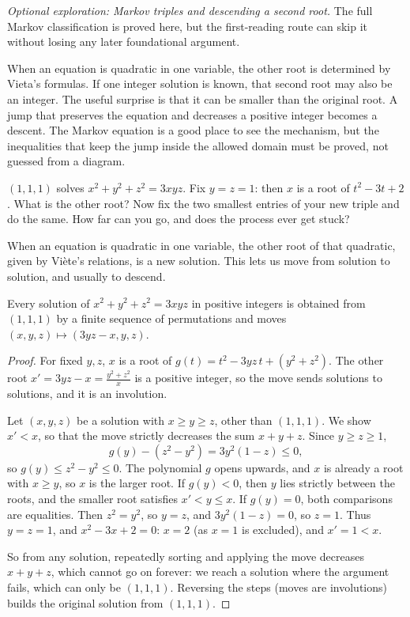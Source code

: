 \emph{Optional exploration: Markov triples and descending a second root.}
The full Markov classification is proved here, but the first-reading route
can skip it without losing any later foundational argument.

When an equation is quadratic in one variable, the other root is determined by Vieta's formulas. If one integer solution is known, that second root may also be an integer. The useful surprise is that it can be smaller than the original root. A jump that preserves the equation and decreases a positive integer becomes a descent. The Markov equation is a good place to see the mechanism, but the inequalities that keep the jump inside the allowed domain must be proved, not guessed from a diagram.

\begin{think}
$(1,1,1)$ solves $x^2+y^2+z^2=3xyz$. Fix $y=z=1$: then $x$ is a root of $t^2-3t+2$. What is the other root? Now fix the two smallest entries of your new triple and do the same. How far can you go, and does the process ever get stuck?
\end{think}

When an equation is quadratic in one variable, the other root of that quadratic, given by Vi\`ete's relations, is a new solution. This lets us move from solution to solution, and usually to descend.

\begin{theorem}[Markov, 1879]\label{thm:markov}
Every solution of $x^2+y^2+z^2=3xyz$ in positive integers is obtained from $(1,1,1)$ by a finite sequence of permutations and moves $(x,y,z)\mapsto(3yz-x,y,z)$.
\end{theorem}
\begin{proof}
For fixed $y,z$, $x$ is a root of $g(t)=t^2-3yz\,t+(y^2+z^2)$. The other root $x'=3yz-x=\frac{y^2+z^2}x$ is a positive integer, so the move sends solutions to solutions, and it is an involution.

Let $(x,y,z)$ be a solution with $x\ge y\ge z$, other than $(1,1,1)$. We show $x'<x$, so that the move strictly decreases the sum $x+y+z$. Since $y\ge z\ge1$,
\[
g(y)-(z^2-y^2)=3y^2(1-z)\le0,
\]
so $g(y)\le z^2-y^2\le0$. The polynomial $g$ opens upwards, and $x$ is already a root with $x\ge y$, so $x$ is the larger root. If $g(y)<0$, then $y$ lies strictly between the roots, and the smaller root satisfies $x'<y\le x$. If $g(y)=0$, both comparisons are equalities. Then $z^2=y^2$, so $y=z$, and $3y^2(1-z)=0$, so $z=1$. Thus $y=z=1$, and $x^2-3x+2=0$: $x=2$ (as $x=1$ is excluded), and $x'=1<x$.

So from any solution, repeatedly sorting and applying the move decreases $x+y+z$, which cannot go on forever: we reach a solution where the argument fails, which can only be $(1,1,1)$. Reversing the steps (moves are involutions) builds the original solution from $(1,1,1)$.
\end{proof}

